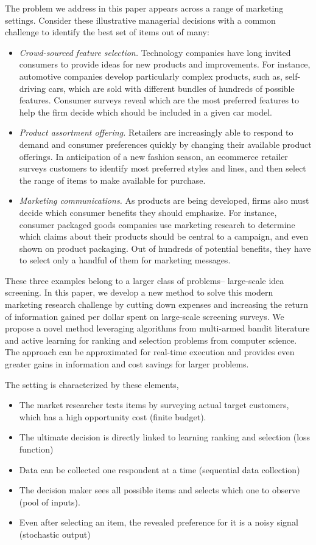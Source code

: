 \documentclass[a4paper,12pt]{article}
\begin{document}
The problem we address in this paper appears across a range of marketing settings. Consider these illustrative managerial decisions with a common challenge to identify the best set of items out of many:

\begin{itemize}
	\item \emph{Crowd-sourced feature selection.} Technology companies have long invited consumers to provide ideas for new products and improvements. For instance, automotive companies develop particularly complex products, such as, self-driving cars, which are sold with different bundles of hundreds of possible features. Consumer surveys reveal which are the most preferred features to help the firm decide which should be included in a given car model.
	\item \emph{Product assortment offering.} Retailers are increasingly able to respond to demand and consumer preferences quickly by changing their available product offerings. In anticipation of a new fashion season, an ecommerce retailer surveys customers to identify most preferred styles and lines, and then select the range of items to make available for purchase.
	\item \emph{Marketing communications.} As products are being developed, firms also must decide which consumer benefits they should emphasize. For instance, consumer packaged goods companies use marketing research to determine which claims about their products should be central to a campaign, and even shown on product packaging. Out of hundreds of potential benefits, they have to select only a handful of them for marketing  messages.
\end{itemize}

These three examples belong to a larger class of problems-- large-scale idea screening. In this paper, we develop a new method to solve this modern marketing research challenge by cutting down expenses and increasing the return of information gained per dollar spent on large-scale screening surveys. We propose a novel method leveraging algorithms from multi-armed bandit literature and active learning for ranking and selection problems from computer science. The approach can be approximated for real-time execution and provides even greater gains in information and cost savings for larger problems. 

The setting is characterized by these elements,
\begin{itemize}
\item The market researcher tests items by surveying actual target customers, which has a high opportunity cost (finite budget).
\item The ultimate decision is directly linked to learning ranking and selection (loss function)
\item Data can be collected one respondent at a time (sequential data collection)
\item The decision maker sees all possible items and selects which one to observe (pool of inputs).
\item Even after selecting an item, the revealed preference for it is a noisy signal (stochastic output)
\end{itemize}
\end{document}
